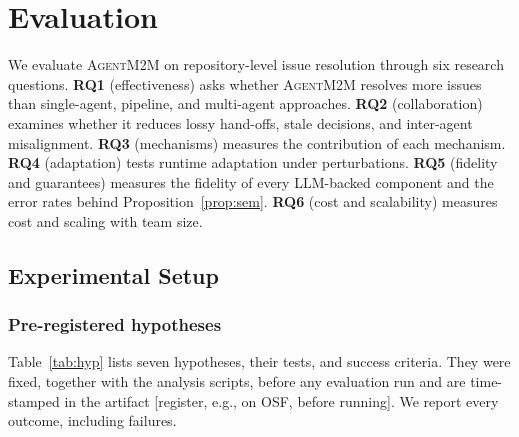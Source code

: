 \documentclass[10pt, anonymous, conference]{IEEEtran}
\theoremstyle{definition}
\theoremstyle{plain}
\theoremstyle{remark}
\newcommand{\tool}{\textsc{AgentM2M}}
\newcommand{\fixme}[1]{{\color{red}[#1]}}
\newcommand{\ph}{{\color{red}\textbf{--.-}}}     %
\newcommand{\hyp}[1]{{\color{blue}#1}}           %
\newif\ifplaceholderdata \placeholderdatatrue     %
\begin{document}

\section{Evaluation}\label{sec:evaluation}

We evaluate \tool{} on repository-level issue resolution through six research
questions.
\textbf{RQ1} (effectiveness) asks whether \tool{} resolves more issues than
single-agent, pipeline, and multi-agent approaches.
\textbf{RQ2} (collaboration) examines whether it reduces lossy hand-offs,
stale decisions, and inter-agent misalignment.
\textbf{RQ3} (mechanisms) measures the contribution of each mechanism.
\textbf{RQ4} (adaptation) tests runtime adaptation under perturbations.
\textbf{RQ5} (fidelity and guarantees) measures the fidelity of every
LLM-backed component and the error rates behind Proposition~\ref{prop:sem}.
\textbf{RQ6} (cost and scalability) measures cost and scaling with team size.

\subsection{Experimental Setup}\label{subsec:setup}

\subsubsection{Pre-registered hypotheses}
Table~\ref{tab:hyp} lists seven hypotheses, their tests, and success criteria.
They were fixed, together with the analysis scripts, before any evaluation run
and are time-stamped in the artifact \fixme{register, e.g., on OSF, before
running}. We report every outcome, including failures.
\end{document}
